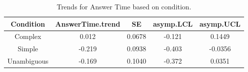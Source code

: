 \begin{table}[h!]
\centering
\begin{tabular}{|c|c|c|c|c|}
\hline
\textbf{Condition} & \textbf{AnswerTime.trend} & \textbf{SE} & \textbf{asymp.LCL} & \textbf{asymp.UCL} \\ \hline
Complex            & 0.012                     & 0.0678      & -0.121             & 0.1449             \\ \hline
Simple             & -0.219                    & 0.0938      & -0.403             & -0.0356            \\ \hline
Unambiguous        & -0.169                    & 0.1040      & -0.372             & 0.0351             \\ \hline
\end{tabular}
\caption{Trends for Answer Time based on condition.}
\label{tab:answertime_trends}
\end{table}

\section{}
